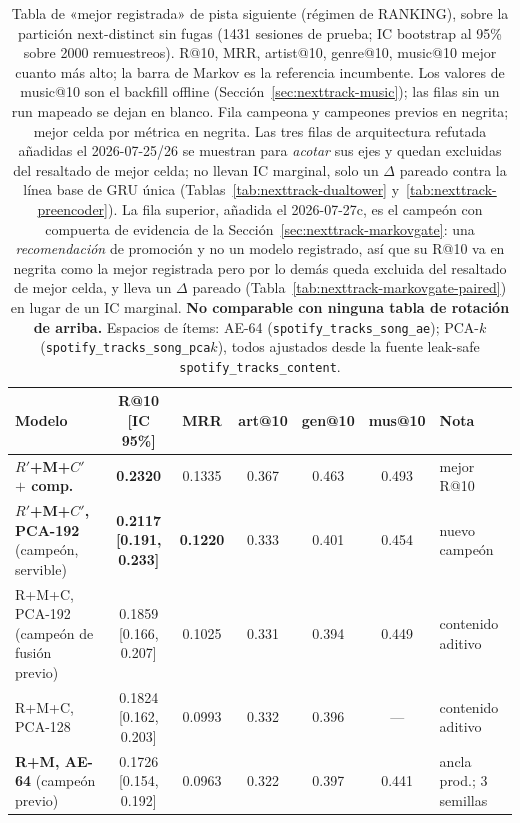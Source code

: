\documentclass[11pt]{article}
\newcommand{\dsid}[1]{\texttt{\small #1}}
\newcommand{\best}[1]{\textbf{#1}}
\newcommand{\Rp}{\ensuremath{R'}}
\newcommand{\Cp}{\ensuremath{C'}}
\begin{document}
\begin{table}[ht]
  \centering
  \caption{Tabla de «mejor registrada» de pista siguiente (régimen de RANKING),
  sobre la partición next-distinct sin fugas (\num{1431} sesiones de prueba; IC
  bootstrap al 95\% sobre \num{2000} remuestreos). R@10, MRR, artist@10, genre@10,
  music@10 mejor cuanto más alto; la barra de Markov es la referencia incumbente. Los
  valores de music@10 son el backfill offline (Sección~\ref{sec:nexttrack-music}); las
  filas sin un run mapeado se dejan en blanco. Fila campeona y campeones previos en
  negrita; mejor celda por métrica en negrita. Las tres filas de arquitectura
  refutada añadidas el 2026-07-25/26 se muestran para \emph{acotar} sus ejes y
  quedan excluidas del resaltado de mejor celda; no llevan IC marginal, solo un
  $\Delta$ pareado contra la línea base de GRU única
  (Tablas~\ref{tab:nexttrack-dualtower} y~\ref{tab:nexttrack-preencoder}).
  La fila superior, añadida el 2026-07-27c, es el campeón con compuerta de evidencia
  de la Sección~\ref{sec:nexttrack-markovgate}: una \emph{recomendación} de promoción
  y no un modelo registrado, así que su R@10 va en negrita como la mejor registrada
  pero por lo demás queda excluida del resaltado de mejor celda, y lleva un $\Delta$
  pareado (Tabla~\ref{tab:nexttrack-markovgate-paired}) en lugar de un IC marginal.
  \textbf{No comparable con ninguna tabla de rotación de arriba.} Espacios de
  ítems: AE-64 (\dsid{spotify\_tracks\_song\_ae}); PCA-$k$
  (\dsid{spotify\_tracks\_song\_pca$k$}), todos ajustados desde la fuente leak-safe
  \dsid{spotify\_tracks\_content}.}
  \label{tab:nexttrack-lb}
  {\footnotesize\setlength{\tabcolsep}{4pt}\begin{tabular}{lcccccl}
    \toprule
    Modelo & R@10 [IC 95\%] & MRR & art@10 & gen@10 & mus@10 & Nota \\
    \midrule
    \best{\Rp+M+\Cp\ $+$ comp.} & \best{0.2320} & 0.1335 & 0.367 & 0.463 & 0.493 & mejor R@10 \\
    \best{\Rp+M+\Cp, PCA-192} (campeón, servible) & \best{0.2117 [0.191, 0.233]} & \best{0.1220} & 0.333 & 0.401 & 0.454 & nuevo campeón \\
    R+M+C, PCA-192 (campeón de fusión previo) & 0.1859 [0.166, 0.207] & 0.1025 & 0.331 & 0.394 & 0.449 & contenido aditivo \\
    R+M+C, PCA-128                        & 0.1824 [0.162, 0.203] & 0.0993 & 0.332 & 0.396 & --- & contenido aditivo \\
    \best{R+M, AE-64} (campeón previo)    & 0.1726 [0.154, 0.192] & 0.0963 & 0.322 & 0.397 & 0.441 & ancla prod.; 3 semillas \\

\end{tabular}}
\end{table}
\end{document}
